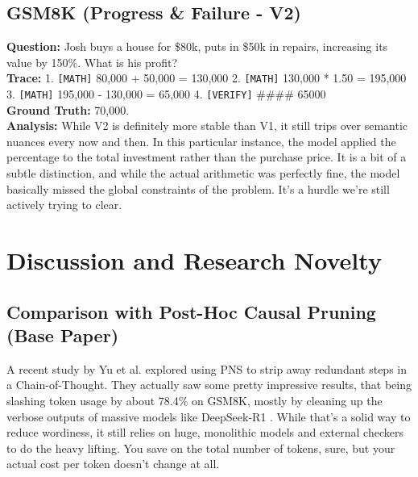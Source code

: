 \documentclass[conference,compsoc]{IEEEtran}
\begin{document}
\subsection{GSM8K (Progress \& Failure - V2)}
\textbf{Question:} Josh buys a house for \$80k, puts in \$50k in repairs, increasing its value by 150\%. What is his profit? \\
\textbf{Trace:}
1. \texttt{[MATH]} 80,000 + 50,000 = 130,000
2. \texttt{[MATH]} 130,000 * 1.50 = 195,000
3. \texttt{[MATH]} 195,000 - 130,000 = 65,000
4. \texttt{[VERIFY]} \#\#\#\# 65000 \\
\textbf{Ground Truth:} 70,000. \\
\textbf{Analysis:} While V2 is definitely more stable than V1, it still trips over semantic nuances every now and then. In this particular instance, the model applied the percentage to the total investment rather than the purchase price. It is a bit of a subtle distinction, and while the actual arithmetic was perfectly fine, the model basically missed the global constraints of the problem. It’s a hurdle we’re still actively trying to clear.

\section{Discussion and Research Novelty}

\subsection{Comparison with Post-Hoc Causal Pruning (Base Paper)}
A recent study by Yu et al. \cite{b7} explored using PNS to strip away redundant steps in a Chain-of-Thought. They actually saw some pretty impressive results, that being slashing token usage by about 78.4\% on GSM8K, mostly by cleaning up the verbose outputs of massive models like DeepSeek-R1 \cite{b20}. While that’s a solid way to reduce wordiness, it still relies on huge, monolithic models and external checkers to do the heavy lifting. You save on the total number of tokens, sure, but your actual cost per token doesn't change at all.
\end{document}
